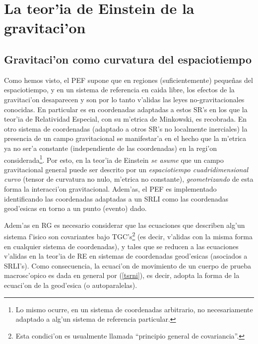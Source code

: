 \chapter{La teor'ia de Einstein de la gravitaci'on}\label{capTEG}

\section{Gravitaci'on como curvatura del espaciotiempo\label{PE}}

Como hemos visto, el PEF supone que en regiones (suficientemente) peque\~nas del espaciotiempo, y en un sistema de referencia en caida libre, los efectos de la gravitaci'on desaparecen y son por lo tanto v'alidas las leyes no-gravitacionales conocidas. En particular es en coordenadas adaptadas a estos SR's en los que la teor'ia de Relatividad Especial, con su m'etrica de Minkowski, es recobrada. En otro sistema de coordenadas (adaptado a otros SR's no localmente inerciales) la presencia de un campo gravitacional se manifestar'a en el hecho que la m'etrica ya no ser'a constante (independiente de las coordenadas) en la regi'on considerada\footnote{Lo mismo ocurre, en un sistema de coordenadas arbitrario, no necesariamente adaptado a alg'un sistema de referencia particular.}. Por esto, en la teor'ia de Einstein \textit{se asume} que un campo gravitacional general puede ser descrito por un \textit{espaciotiempo cuadridimensional curvo} (tensor de curvatura no nulo, m'etrica no constante), \textit{geometrizando} de esta forma la interacci'on gravitacional. Adem'as, el PEF es implementado identificando las coordenadas adaptadas a un SRLI como las coordenadas geod'esicas en torno a un punto (evento) dado.

Adem'as en RG es necesario considerar que las ecuaciones que describen alg'un sistema f'isico son covariantes bajo TGC's\footnote{Esta condici'on es usualmente llamada ``principio general de covariancia''.} (es decir, v'alidas con la misma forma en cualquier sistema de coordenadas), y tales que se reducen a las ecuaciones v'alidas en la teor'ia de RE en sistemas de coordenadas geod'esicas (asociados a SRLI's). Como consecuencia, la ecuaci'on de movimiento de un cuerpo de prueba macrosc'opico es dada en general por (\ref{tsrni}), es decir, adopta la forma de la ecuaci'on de la geod'esica (o autoparalelas).

